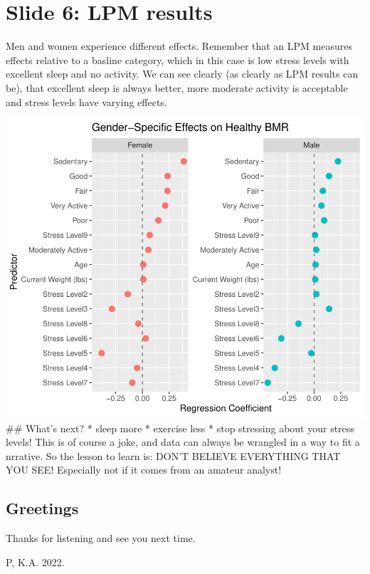 \documentclass[11pt,preprint]{elsarticle}
\numberwithin{equation}{section}
\numberwithin{figure}{section}
\numberwithin{table}{section}
\newlength{\cslhangindent}
\newenvironment{CSLReferences}[2] %
{\begin{list}{}{%
	\setlength{\itemindent}{0pt}
	\setlength{\leftmargin}{0pt}
	\setlength{\parsep}{0pt}
	\ifodd #1
	\setlength{\leftmargin}{\cslhangindent}
	\setlength{\itemindent}{-1\cslhangindent}
	\fi
	\setlength{\itemsep}{#2\baselineskip}}}
{\end{list}}
\begin{document}
\section{Slide 6: LPM results}\label{slide-6-lpm-results}

Men and women experience different effects. Remember that an LPM
measures effects relative to a basline category, which in this case is
low stress levels with excellent sleep and no activity. We can see
clearly (as clearly as LPM results can be), that excellent sleep is
always better, more moderate activity is acceptable and stress levels
have varying effects.

\includegraphics{Question5_files/figure-latex/unnamed-chunk-2-1.pdf}
\#\# What's next? * sleep more * exercise less * stop stressing about
your stress levels! This is of course a joke, and data can always be
wrangled in a way to fit a nrrative. So the lesson to learn is: DON'T
BELIEVE EVERYTHING THAT YOU SEE! Especially not if it comes from an
amateur analyst!

\subsection{Greetings}\label{greetings}

Thanks for listening and see you next time.

\label{refs}
\begin{CSLReferences}{1}{1}
P, K.A. 2022.

\end{CSLReferences}


\end{document}
